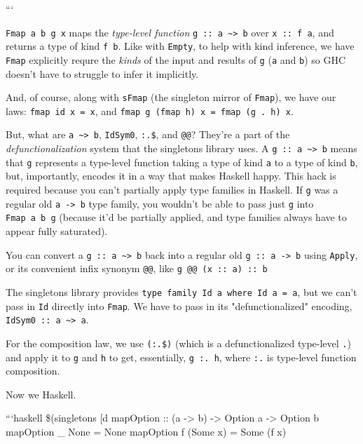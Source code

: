 \documentclass[]{article}
\begin{document}
```

\texttt{Fmap\ a\ b\ g\ x} maps the \emph{type-level function}
\texttt{g\ ::\ a\ \textasciitilde{}\textgreater{}\ b} over \texttt{x\ ::\ f\ a},
and returns a type of kind \texttt{f\ b}. Like with \texttt{Empty}, to help with
kind inference, we have \texttt{Fmap} explicitly requre the \emph{kinds} of the
input and results of \texttt{g} (\texttt{a} and \texttt{b}) so GHC doesn't have
to struggle to infer it implicitly.

And, of course, along with \texttt{sFmap} (the singleton mirror of
\texttt{Fmap}), we have our laws: \texttt{fmap\ id\ x\ =\ x}, and
\texttt{fmap\ g\ (fmap\ h)\ x\ =\ fmap\ (g\ .\ h)\ x}.

But, what are \texttt{a\ \textasciitilde{}\textgreater{}\ b}, \texttt{IdSym0},
\texttt{:.\$}, and \texttt{@@}? They're a part of the \emph{defunctionalization}
system that the singletons library uses. A
\texttt{g\ ::\ a\ \textasciitilde{}\textgreater{}\ b} means that \texttt{g}
represents a type-level function taking a type of kind \texttt{a} to a type of
kind \texttt{b}, but, importantly, encodes it in a way that makes Haskell happy.
This hack is required because you can't partially apply type families in
Haskell. If \texttt{g} was a regular old \texttt{a\ -\textgreater{}\ b} type
family, you wouldn't be able to pass just \texttt{g} into \texttt{Fmap\ a\ b\ g}
(because it'd be partially applied, and type families always have to appear
fully saturated).

You can convert a \texttt{g\ ::\ a\ \textasciitilde{}\textgreater{}\ b} back
into a regular old \texttt{g\ ::\ a\ -\textgreater{}\ b} using \texttt{Apply},
or its convenient infix synonym \texttt{@@}, like
\texttt{g\ @@\ (x\ ::\ a)\ ::\ b}

The singletons library provides
\texttt{type\ family\ Id\ a\ where\ Id\ a\ =\ a}, but we can't pass in
\texttt{Id} directly into \texttt{Fmap}. We have to pass in its
"defunctionalized" encoding,
\texttt{IdSym0\ ::\ a\ \textasciitilde{}\textgreater{}\ a}.

For the composition law, we use \texttt{(:.\$)} (which is a defunctionalized
type-level \texttt{.}) and apply it to \texttt{g} and \texttt{h} to get,
essentially, \texttt{g\ :.\ h}, where \texttt{:.} is type-level function
composition.

Now we Haskell.

```haskell \$(singletons {[}d\textbar{} mapOption :: (a -\textgreater{} b)
-\textgreater{} Option a -\textgreater{} Option b mapOption \_ None = None
mapOption f (Some x) = Some (f x)
\end{document}
